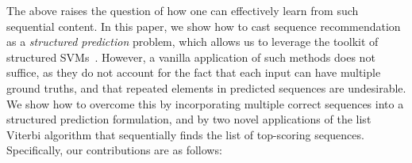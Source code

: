 The above raises the question of how one can effectively learn from such sequential content.
In this paper, we show how to cast sequence recommendation as a \emph{structured prediction} problem,
which allows us to leverage the toolkit of structured SVMs~\citep{taskar2004max,tsochantaridis2004support}.
However, a vanilla application of such methods does not suffice,
as they do not account for the fact that each input can have multiple ground truths,
and that repeated elements in predicted sequences are undesirable.
We show how to overcome this by
incorporating multiple correct sequences into a structured prediction formulation,
and by two novel applications of the list Viterbi algorithm that sequentially finds the list of top-scoring sequences.
Specifically, our contributions are as follows:
